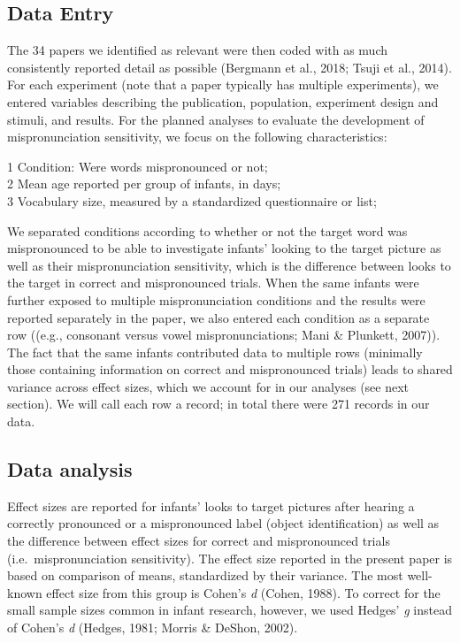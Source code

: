 \documentclass[man]{apa6}
\theoremstyle{definition}
\theoremstyle{definition}
\theoremstyle{definition}
\theoremstyle{remark}
\begin{document}
\subsection{Data Entry}\label{data-entry}

The 34 papers we identified as relevant were then coded with as much
consistently reported detail as possible (Bergmann et al., 2018; Tsuji
et al., 2014). For each experiment (note that a paper typically has
multiple experiments), we entered variables describing the publication,
population, experiment design and stimuli, and results. For the planned
analyses to evaluate the development of mispronunciation sensitivity, we
focus on the following characteristics:

1 Condition: Were words mispronounced or not;\\
2 Mean age reported per group of infants, in days;\\
3 Vocabulary size, measured by a standardized questionnaire or list;

We separated conditions according to whether or not the target word was
mispronounced to be able to investigate infants' looking to the target
picture as well as their mispronunciation sensitivity, which is the
difference between looks to the target in correct and mispronounced
trials. When the same infants were further exposed to multiple
mispronunciation conditions and the results were reported separately in
the paper, we also entered each condition as a separate row ((e.g.,
consonant versus vowel mispronunciations; Mani \& Plunkett, 2007)). The
fact that the same infants contributed data to multiple rows (minimally
those containing information on correct and mispronounced trials) leads
to shared variance across effect sizes, which we account for in our
analyses (see next section). We will call each row a record; in total
there were 271 records in our data.

\subsection{Data analysis}\label{data-analysis}

Effect sizes are reported for infants' looks to target pictures after
hearing a correctly pronounced or a mispronounced label (object
identification) as well as the difference between effect sizes for
correct and mispronounced trials (i.e.~mispronunciation sensitivity).
The effect size reported in the present paper is based on comparison of
means, standardized by their variance. The most well-known effect size
from this group is Cohen's \emph{d} (Cohen, 1988). To correct for the
small sample sizes common in infant research, however, we used Hedges'
\emph{g} instead of Cohen's \emph{d} (Hedges, 1981; Morris \& DeShon,
2002).
\end{document}
